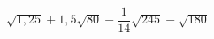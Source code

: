 \begin{ex}[type=calculate]
	\begin{condition}
		\( \sqrt{1,25}+1,5\sqrt{80}-\dfrac{1}{14}\sqrt{245}-\sqrt{180} \)
	\end{condition}
\end{ex}